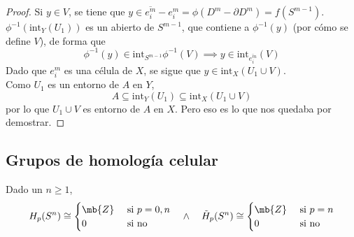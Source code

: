 \begin{proof}
Si $y \in V$, se tiene que $y \in \overline{e^m_i}-e^m_i=\phi(D^m-\partial D^m)=f(S^{m-1})$. $\phi^{-1}(\mbox{int}_Y(U_1))$ es un abierto de $S^{m-1}$, que contiene a $\phi^{-1}(y)$ (por cómo se define $V$), de forma que $$\phi^{-1}(y) \in \mbox{int}_{S^{m-1}}\phi^{-1}(V) \implies y \in \mbox{int}_{\overline{e^m_i}}(V)$$ Dado que $e^m_i$ es una célula de $X$, se sigue que $y \in \mbox{int}_X(U_1\cup V)$. 
\\

Como $U_1$ es un entorno de $A$ en $Y$, $$A \subseteq \mbox{int}_Y(U_1)\subseteq \mbox{int}_X(U_1\cup V)$$ por lo que $U_1\cup V$ es entorno de $A$ en $X$. Pero eso es lo que nos quedaba por demostrar. 
\end{proof}

\subsection{Grupos de homología celular}
\begin{teo} Dado un $n \geq 1$,
\[H_p(S^n)\cong \begin{cases}\mb{Z} & \mbox{ si }p=0,n \\ 0 & \mbox{ si no}\end{cases} \quad\land \quad \tilde{H}_p(S^n)\cong \begin{cases}\mb{Z} & \mbox{ si }p=n \\ 0 & \mbox{ si no}\end{cases}\]
\end{teo}

